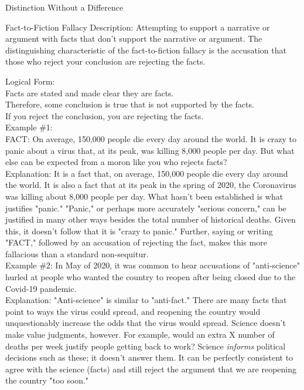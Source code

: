 \documentclass[a4paper,12pt,single,pdftex]{scrartcl}
\begin{document}
  

Distinction Without a Difference

Fact-to-Fiction Fallacy
    Description: Attempting to support a narrative or argument with facts that don't support the narrative or argument. The distinguishing characteristic of the fact-to-fiction fallacy is the accusation that those who reject your conclusion are rejecting the facts.

    
      Logical Form:
    \\

    
      Facts are stated and made clear they are facts.
    \\

    
      Therefore, some conclusion is true that is not supported by the facts.
    \\

    
      If you reject the conclusion, you are rejecting the facts.
    \\

    
      Example \#1:
    \\

    
      FACT: On average, 150,000 people die every day around the world. It is crazy to panic about a virus that, at its peak, was killing 8,000 people per day. But what else can be expected from a moron like you who rejects facts?
    \\

    
      Explanation: It is a fact that, on average, 150,000 people die every day around the world. It is also a fact that at its peak in the spring of 2020, the Coronavirus was killing about 8,000 people per day. What hasn't been established is what justifies "panic." "Panic," or perhaps more accurately "serious concern," can be justified in many other ways besides the total number of historical deaths. Given this, it doesn't follow that it is "crazy to panic." Further, saying or writing "FACT," followed by an accusation of rejecting the fact, makes this more fallacious than a standard non-sequitur.
    \\

    
      Example \#2: In May of 2020, it was common to hear accusations of "anti-science" hurled at people who wanted the country to reopen after being closed due to the Covid-19 pandemic.
    \\

    
      Explanation: "Anti-science" is similar to "anti-fact." There are many facts that point to ways the virus could spread, and reopening the country would unquestionably increase the odds that the virus would spread. Science doesn't make value judgments, however. For example, would an extra X number of deaths per week justify people getting back to work? Science {\em informs} political decisions such as these; it doesn't answer them. It can be perfectly consistent to agree with the science (facts) and still reject the argument that we are reopening the country "too soon."
    \\
\end{document}
